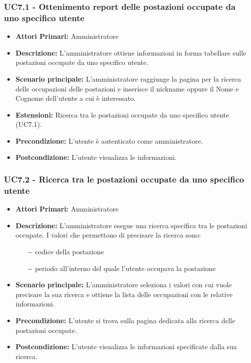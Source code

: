 \subsubsection{ UC7.1 - Ottenimento report delle postazioni occupate da uno specifico utente}
\begin{itemize}
           	\item\textbf{Attori Primari:} 
           	Amministratore
           	\item\textbf{Descrizione:} 
           	L'amministratore ottiene informazioni in forma tabellare sulle postazioni occupate da uno specifico utente.
           	\item\textbf{Scenario principale:} 
           	L'amministratore raggiunge la pagina per la ricerca delle occupazioni delle postazioni e inserisce il nickname oppure il Nome e Cognome dell'utente a cui è interessato.
           	\item\textbf{Estensioni:}
           	Ricerca tra le postazioni occupate da uno specifico utente (UC7.1).
           	\item\textbf{Precondizione:} 
           	L'utente è autenticato come amministratore.
           	\item\textbf{Postcondizione:}
           	L'utente visualizza le informazioni.
\end{itemize}


\subsubsection{ UC7.2 - Ricerca tra le postazioni occupate da uno specifico utente}
\begin{itemize}
	\item\textbf{Attori Primari:} 
	Amministratore
	\item\textbf{Descrizione:} 
	L'amministratore esegue una ricerca specifica tra le postazioni occupate.
	I valori che permettono di precisare la ricerca sono:
	\begin{itemize}
		\item[$-$] codice della postazione
		\item[$-$] periodo all'interno del quale l'utente occupava la postazione
	\end{itemize}
	\item\textbf{Scenario principale:} 
	L'amministratore seleziona i valori con cui vuole precisare la sua ricerca e ottiene la lista delle occupazioni con le relative informazioni.
	\item\textbf{Precondizione:} 
	L'utente si trova sulla pagina dedicata alla ricerca delle postazioni occupate.
	\item\textbf{Postcondizione:}
	L'utente visualizza le informazioni specificate dalla sua ricerca.
\end{itemize}

